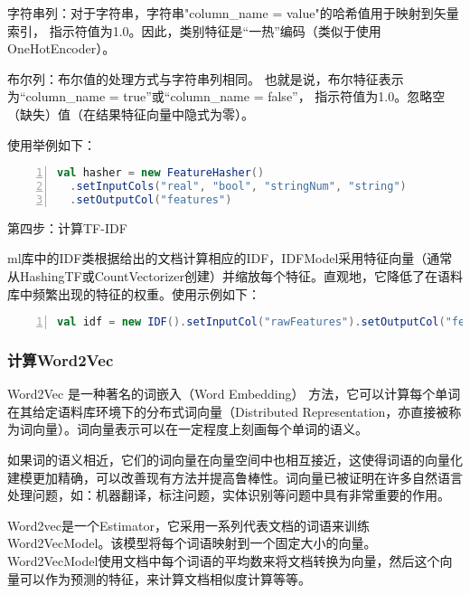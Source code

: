 \documentclass[lang=cn,11pt]{elegantpaper}
\begin{document}
字符串列：对于字符串，字符串"column\_name = value"的哈希值用于映射到矢量索引，
指示符值为1.0。因此，类别特征是“一热”编码（类似于使用OneHotEncoder）。

布尔列：布尔值的处理方式与字符串列相同。
也就是说，布尔特征表示为“column\_name = true”或“column\_name = false”，
指示符值为1.0。忽略空（缺失）值（在结果特征向量中隐式为零）。

使用举例如下：
\begin{lstlisting}[language={Scala},numbers=left,numberstyle=\tiny,%frame=shadowbox,  
  rulesepcolor=\color{red!20!green!20!blue!20},  
  keywordstyle=\color{blue!70!black},  
  commentstyle=\color{blue!90!},  
  basicstyle=\ttfamily]  
val hasher = new FeatureHasher()
  .setInputCols("real", "bool", "stringNum", "string")
  .setOutputCol("features")
\end{lstlisting}\par

第四步：计算TF-IDF

ml库中的IDF类根据给出的文档计算相应的IDF，IDFModel采用特征向量（通常从HashingTF或CountVectorizer创建）并缩放每个特征。直观地，它降低了在语料库中频繁出现的特征的权重。使用示例如下：
\begin{lstlisting}[language={Scala},numbers=left,numberstyle=\tiny,%frame=shadowbox,  
  rulesepcolor=\color{red!20!green!20!blue!20},  
  keywordstyle=\color{blue!70!black},  
  commentstyle=\color{blue!90!},  
  basicstyle=\ttfamily]  
val idf = new IDF().setInputCol("rawFeatures").setOutputCol("features")
\end{lstlisting}\par

\subsubsection{计算Word2Vec}
Word2Vec 是一种著名的词嵌入（Word Embedding） 方法，它可以计算每个单词在其给定语料库环境下的分布式词向量（Distributed Representation，亦直接被称为词向量）。词向量表示可以在一定程度上刻画每个单词的语义。

如果词的语义相近，它们的词向量在向量空间中也相互接近，这使得词语的向量化建模更加精确，可以改善现有方法并提高鲁棒性。词向量已被证明在许多自然语言处理问题，如：机器翻译，标注问题，实体识别等问题中具有非常重要的作用。

​ Word2vec是一个Estimator，它采用一系列代表文档的词语来训练Word2VecModel。该模型将每个词语映射到一个固定大小的向量。Word2VecModel使用文档中每个词语的平均数来将文档转换为向量，然后这个向量可以作为预测的特征，来计算文档相似度计算等等。
\end{document}

